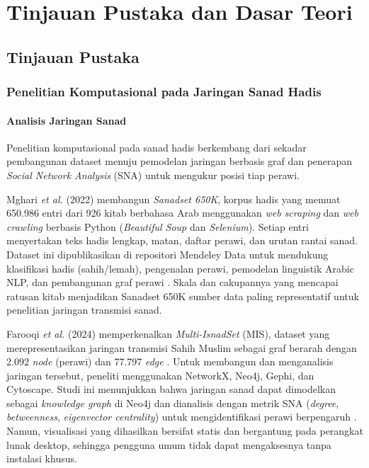 \chapter{Tinjauan Pustaka dan Dasar Teori}

\section{Tinjauan Pustaka}
\subsection{Penelitian Komputasional pada Jaringan Sanad Hadis}
\subsubsection{Analisis Jaringan Sanad}

Penelitian komputasional pada sanad hadis berkembang dari sekadar pembangunan dataset menuju pemodelan jaringan berbasis graf dan penerapan \textit{Social Network Analysis} (SNA) untuk mengukur posisi tiap perawi.

Mghari \textit{et al.} (2022) membangun \textit{Sanadset 650K}, korpus hadis yang memuat 650.986 entri dari 926 kitab berbahasa Arab menggunakan \textit{web scraping} dan \textit{web crawling} berbasis Python (\textit{Beautiful Soup} dan \textit{Selenium}). Setiap entri menyertakan teks hadis lengkap, matan, daftar perawi, dan urutan rantai sanad. Dataset ini dipublikasikan di repositori Mendeley Data untuk mendukung klasifikasi hadis (sahih/lemah), pengenalan perawi, pemodelan linguistik Arabic NLP, dan pembangunan graf perawi \cite{MGHARI2022108540}. Skala dan cakupannya yang mencapai ratusan kitab menjadikan Sanadset 650K sumber data paling representatif untuk penelitian jaringan transmisi sanad.

\begin{sloppypar}
Farooqi \textit{et al.} (2024) memperkenalkan \textit{Multi-IsnadSet} (MIS), dataset yang merepresentasikan jaringan transmisi Sahih Muslim sebagai graf berarah dengan 2.092 \textit{node} (perawi) dan 77.797 \textit{edge} \cite{FAROOQI2024110439}. Untuk membangun dan menganalisis jaringan tersebut, peneliti menggunakan NetworkX, Neo4j, Gephi, dan Cytoscape. Studi ini menunjukkan bahwa jaringan sanad dapat dimodelkan sebagai \textit{knowledge graph} di Neo4j dan dianalisis dengan metrik SNA (\textit{degree}, \textit{betweenness}, \textit{eigenvector centrality}) untuk mengidentifikasi perawi berpengaruh \cite{FAROOQI2024110439}. Namun, visualisasi yang dihasilkan bersifat statis dan bergantung pada perangkat lunak desktop, sehingga pengguna umum tidak dapat mengaksesnya tanpa instalasi khusus.
\end{sloppypar}

